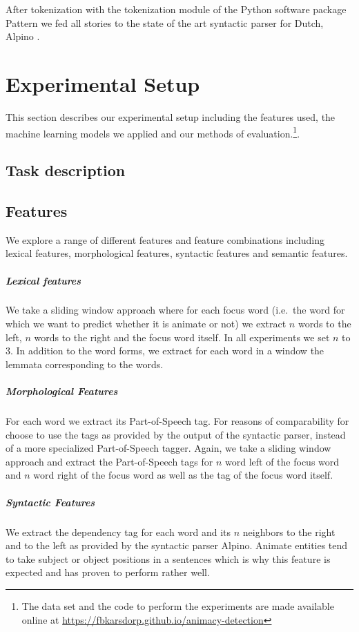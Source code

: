 \documentclass[a4paper,UKenglish]{oasics}
\begin{document}
After tokenization with the tokenization module of the Python software
package Pattern \cite{smedt:12} we fed all stories to the
state of the art syntactic parser for Dutch, Alpino \cite{bouma:01}.

\section{Experimental Setup}\label{sec:models}
This section describes our experimental setup including the features
used, the machine learning models we applied and our methods of
evaluation.\footnote{The data set and the code to perform the
  experiments are made available online at
  \url{https://fbkarsdorp.github.io/animacy-detection}}.

\subsection{Task description}

\subsection{Features}

We explore a range of different features and feature combinations
including lexical features, morphological features, syntactic features
and semantic features.

\subparagraph*{Lexical features}
We take a sliding window approach where for each focus word (i.e.\ the
word for which we want to predict whether it is animate or not) we
extract $n$ words to the left, $n$ words to the right and the focus
word itself. In all experiments we set $n$ to 3. In addition to the
word forms, we extract for each word in a window the lemmata
corresponding to the words.

\subparagraph*{Morphological Features}
For each word we extract its Part-of-Speech tag. For reasons of
comparability for choose to use the tags as provided by the
output of the syntactic parser, instead of a more specialized
Part-of-Speech tagger. Again, we take a sliding window approach and
extract the Part-of-Speech tags for $n$ word left of the focus word
and $n$ word right of the focus word as well as the tag of the focus
word itself.

\subparagraph*{Syntactic Features}
We extract the dependency tag for each word and its $n$ neighbors to
the right and to the left as provided by the syntactic parser
Alpino. Animate entities tend to take subject or object positions in a
sentences which is why this feature is expected and has proven to
perform rather well.
\end{document}
